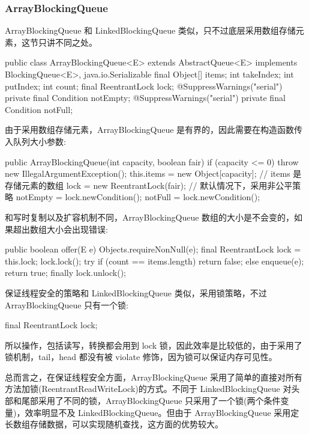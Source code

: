 \subsubsection{ArrayBlockingQueue}

ArrayBlockingQueue 和 LinkedBlockingQueue 类似，只不过底层采用数组存储元素，这节只讲不同之处。

\begin{Java}
public class ArrayBlockingQueue<E> extends AbstractQueue<E> implements BlockingQueue<E>, java.io.Serializable {
    final Object[] items;
    int takeIndex;
    int putIndex;
    int count;
    final ReentrantLock lock;
    @SuppressWarnings("serial")
    private final Condition notEmpty;
    @SuppressWarnings("serial")
    private final Condition notFull;
}
\end{Java}

由于采用数组存储元素，ArrayBlockingQueue 是有界的，因此需要在构造函数传入队列大小参数:

\begin{Java}
public ArrayBlockingQueue(int capacity, boolean fair) {
    if (capacity <= 0)
        throw new IllegalArgumentException();
    this.items = new Object[capacity];  // items 是存储元素的数组
    lock = new ReentrantLock(fair);     // 默认情况下，采用非公平策略
    notEmpty = lock.newCondition();
    notFull =  lock.newCondition();
}
\end{Java}

和写时复制以及扩容机制不同，ArrayBlockingQueue 数组的大小是不会变的，如果超出数组大小会出现错误:

\begin{Java}
public boolean offer(E e) {
    Objects.requireNonNull(e);
    final ReentrantLock lock = this.lock;
    lock.lock();
    try {
        if (count == items.length)
            return false;
        else {
            enqueue(e);
            return true;
        }
    } finally {
        lock.unlock();
    }
}
\end{Java}

保证线程安全的策略和 LinkedBlockingQueue 类似，采用锁策略，不过 ArrayBlockingQueue 只有一个锁:

\begin{Java}
final ReentrantLock lock;
\end{Java}

所以操作，包括读写，转换都会用到 lock 锁，因此效率是比较低的，由于采用了锁机制，tail，head 都没有被 violate 修饰，因为锁可以保证内存可见性。

总而言之，在保证线程安全方面，ArrayBlockingQueue 采用了简单的直接对所有方法加锁(ReentrantReadWriteLock)的方式。不同于 LinkedBlockingQueue 对头部和尾部采用了不同的锁，ArrayBlockingQueue 只采用了一个锁(两个条件变量)，效率明显不及 LinkedBlockingQueue。但由于 ArrayBlockingQueue 采用定长数组存储数据，可以实现随机查找，这方面的优势较大。

